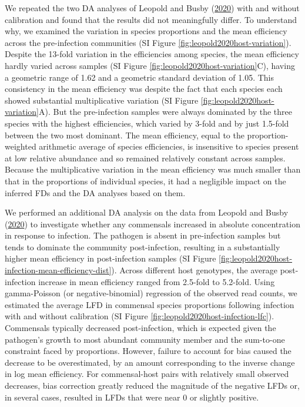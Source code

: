 \documentclass[
]{article}
\begin{document}
We repeated the two DA analyses of Leopold and Busby (\protect\hyperlink{ref-leopold2020host}{2020}) with and without calibration and found that the results did not meaningfully differ.
To understand why, we examined the variation in species proportions and the mean efficiency across the pre-infection communities (SI Figure \ref{fig:leopold2020host-variation}).
Despite the 13-fold variation in the efficiencies among species, the mean efficiency hardly varied across samples (SI Figure \ref{fig:leopold2020host-variation}C), having a geometric range of 1.62 and a geometric standard deviation of 1.05.
This consistency in the mean efficiency was despite the fact that each species each showed substantial multiplicative variation (SI Figure \ref{fig:leopold2020host-variation}A).
But the pre-infection samples were always dominated by the three species with the highest efficiencies, which varied by 3-fold and by just 1.5-fold between the two most dominant.
The mean efficiency, equal to the proportion-weighted arithmetic average of species efficiencies, is insensitive to species present at low relative abundance and so remained relatively constant across samples.
Because the multiplicative variation in the mean efficiency was much smaller than that in the proportions of individual species, it had a negligible impact on the inferred FDs and the DA analyses based on them.

We performed an additional DA analysis on the data from Leopold and Busby (\protect\hyperlink{ref-leopold2020host}{2020}) to investigate whether any commensals increased in absolute concentration in response to infection.
The pathogen is absent in pre-infection samples but tends to dominate the community post-infection, resulting in a substantially higher mean efficiency in post-infection samples (SI Figure \ref{fig:leopold2020host-infection-mean-efficiency-dist}).
Across different host genotypes, the average post-infection increase in mean efficiency ranged from 2.5-fold to 5.2-fold.
Using gamma-Poisson (or negative-binomial) regression of the observed read counts, we estimated the average LFD in commensal species proportions following infection with and without calibration (SI Figure \ref{fig:leopold2020host-infection-lfc}).
Commensals typically decreased post-infection, which is expected given the pathogen's growth to most abundant community member and the sum-to-one constraint faced by proportions.
However, failure to account for bias caused the decrease to be overestimated, by an amount corresponding to the inverse change in log mean efficiency.
For commensal-host pairs with relatively small observed decreases, bias correction greatly reduced the magnitude of the negative LFDs or, in several cases, resulted in LFDs that were near 0 or slightly positive.
\end{document}
